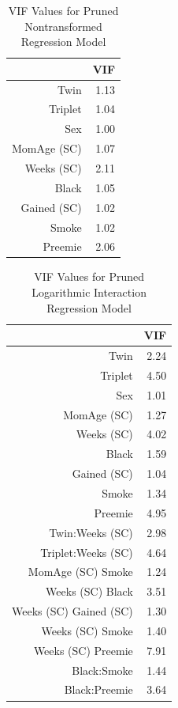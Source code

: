 \documentclass{article}\usepackage[]{graphicx}\usepackage[]{xcolor}
\begin{document}
\begin{table}[H]
\centering
\begin{tabular}{rr}
  \hline
 & VIF \\ 
  \hline
Twin & 1.13 \\ 
  Triplet & 1.04 \\ 
  Sex & 1.00 \\ 
  MomAge (SC) & 1.07 \\ 
  Weeks (SC) & 2.11 \\ 
  Black & 1.05 \\ 
  Gained (SC) & 1.02 \\ 
  Smoke & 1.02 \\ 
  Preemie & 2.06 \\ 
   \hline
\end{tabular}
\caption{VIF Values for Pruned Nontransformed Regression Model} 
\label{vif.val.assu}
\end{table}

\begin{table}[H]
\centering
\begin{tabular}{rr}
  \hline
 & VIF \\ 
  \hline
Twin & 2.24 \\ 
  Triplet & 4.50 \\ 
  Sex & 1.01 \\ 
  MomAge (SC) & 1.27 \\ 
  Weeks (SC) & 4.02 \\ 
  Black & 1.59 \\ 
  Gained (SC) & 1.04 \\ 
  Smoke & 1.34 \\ 
  Preemie & 4.95 \\ 
  Twin:Weeks (SC) & 2.98 \\ 
  Triplet:Weeks (SC) & 4.64 \\ 
  MomAge (SC) Smoke & 1.24 \\ 
  Weeks (SC) Black & 3.51 \\ 
  Weeks (SC) Gained (SC) & 1.30 \\ 
  Weeks (SC) Smoke & 1.40 \\ 
  Weeks (SC) Preemie & 7.91 \\ 
  Black:Smoke & 1.44 \\ 
  Black:Preemie & 3.64 \\ 
   \hline
\end{tabular}
\caption{VIF Values for Pruned Logarithmic Interaction Regression Model} 
\label{vif.val.accur}
\end{table}
\end{document}
